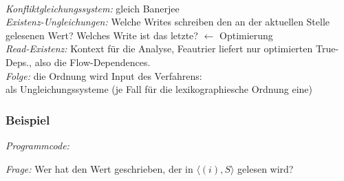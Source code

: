 
~\\[0.5cm]
\emph{Konfliktgleichungssystem:} gleich Banerjee\\[0.2cm]
\emph{Existenz-Ungleichungen:} Welche \glqq Writes \grqq schreiben den an der aktuellen Stelle gelesenen Wert? Welches \glqq Write \grqq ist das letzte? $\leftarrow$ Optimierung\\[0.2cm]
\emph{Read-Existenz:} Kontext für die Analyse, Feautrier liefert nur optimierten True-Deps., also die Flow-Dependences.\\[0.2cm]
\emph{Folge:} die Ordnung wird Input des Verfahrens:\\
als Ungleichungssysteme (je Fall für die lexikographiesche Ordnung eine)

\subsubsection{Beispiel}
\textit{Programmcode:}

\begin{procedure}[H]
\SetLine
{}
\end{procedure}

\textit{Frage:} Wer hat den Wert geschrieben, der in $\langle (i),S \rangle$ gelesen wird?\\

